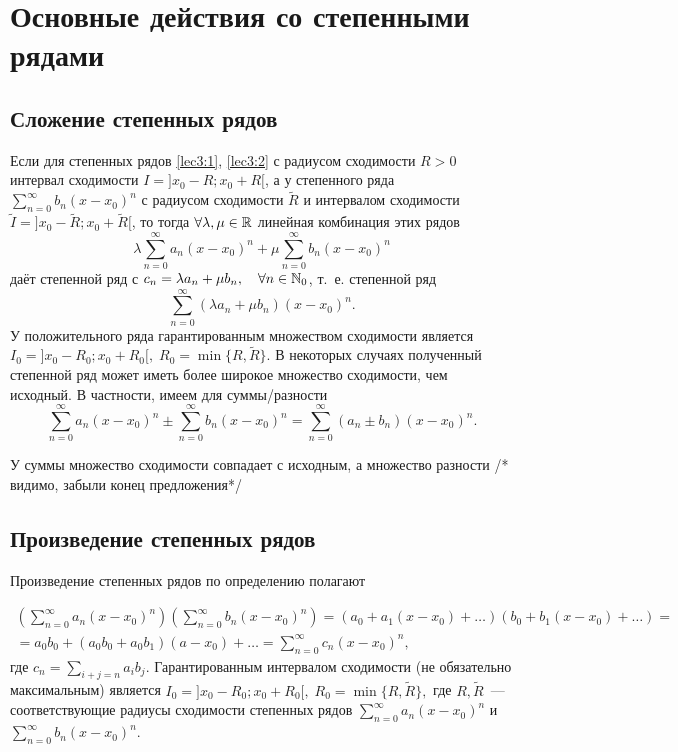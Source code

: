\documentclass[../../main.tex]{subfiles}
\begin{document}
    \section{Основные действия со степенными рядами}
    \subsection{Сложение степенных рядов}
    
    Если для степенных рядов \eqref{lec3:1}, \eqref{lec3:2}  с радиусом 
    сходимости $R > 0$ интервал сходимости $I = ]x_0-R; x_0 + R[$, а у 
    степенного ряда $\sum\limits_{n = 0}^{\infty} b_n(x-x_0)^n$ с радиусом 
    сходимости $\widetilde R$ и интервалом сходимости $\widetilde I = 
    ]x_0-\widetilde R; x_0 + \widetilde R[$, то тогда $\forall \lambda, \mu 
    \in 
    \mathbb{R}$ линейная комбинация этих рядов
    \[\lambda \sum\limits_{n = 0}^{\infty}a_n(x-x_0)^n + \mu 
    \sum\limits_{n = 0}^{\infty} b_n(x-x_0)^n \]
    даёт степенной ряд с $c_n = \lambda a_n + \mu b_n, \quad \forall n \in 
    \mathbb{N}_0$, т.~е. степенной ряд
    \[ \sum\limits_{n = 0}^{\infty}(\lambda a_n + \mu b_n)(x-x_0)^n. \]
    У положительного ряда гарантированным множеством сходимости является 
    $I_0 = ]x_0-R_0; x_0 + R_0[, \; R_0 = \min \{R, \widetilde R\}$. В 
    некоторых случаях полученный степенной ряд может иметь более широкое 
    множество сходимости, чем исходный. В частности, имеем для суммы/разности
    \[ \sum\limits_{n = 0}^{\infty}a_n(x-x_0)^n \pm 
    \sum\limits_{n = 0}^{\infty}b_n(x-x_0)^n = 
    \sum\limits_{n = 0}^{\infty}(a_n \pm b_n) (x-x_0)^n.  \]

    У суммы множество сходимости совпадает с исходным, а множество разности 
    /* видимо, забыли конец предложения*/
    
    \subsection{Произведение степенных рядов}
    Произведение степенных рядов по определению полагают

    \begin{multline*}
        \left( \sum\limits_{n = 0}^{\infty}a_n(x-x_0)^n \right)
        \left( \sum\limits_{n = 0}^{\infty}b_n(x-x_0)^n \right) = 
        (a_0 + a_1(x - x_0) + \ldots)(b_0 + b_1(x - x_0) + \ldots) =
        \\ = a_0b_0 + (a_0b_0 + a_0b_1)(a - x_0) + \ldots = 
        \sum\limits_{n = 0}^{\infty}c_n(x-x_0)^n, 
    \end{multline*}
    где $c_n = \sum\limits_{i + j = n} a_ib_j$. Гарантированным интервалом 
    сходимости (не обязательно максимальным) является $I_0 = ]x_0-R_0; x_0 + 
    R_0[, \; R_0 = \min \{R, \widetilde R\},$ где $R, \widetilde R$~--- 
    соответствующие радиусы сходимости степенных рядов $\sum\limits_{n = 0}^
    {\infty}a_n(x-x_0)^n$ и $\sum\limits_{n = 0}^{\infty}b_n(x-x_0)^n$.
    
\end{document}
